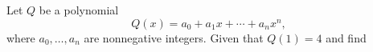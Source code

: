 Let $Q$ be a polynomial \[Q(x)=a_0+a_1x+\cdots+a_nx^n,\] where $a_0,\ldots,a_n$ are nonnegative integers.  Given that $Q(1)=4$ and  find 